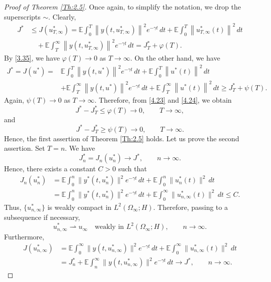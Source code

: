 \documentclass[a4paper,12pt]{article}
\numberwithin{equation}{section}
\begin{document}
\begin{proof}[Proof of Theorem \ref{Th:2.5}] Once again, to simplify the notation, we drop the superscripts $\sim$. Clearly,  
\begin{align}
J^*
&\leq
J(u_{T,\infty}^*) =
\mathbb{E}
\int_0^T
\left\|
y(t,u_{T,\infty}^*)
\right\|^2
e^{-\gamma t}\,dt
+
\mathbb{E}
\int_0^T
\left\|
u_{T,\infty}^*(t)
\right\|^2\,dt
\nonumber\\
&\quad+
\mathbb{E}
\int_T^\infty
\left\|
y(t,u_{T,\infty}^*)
\right\|^2
e^{-\gamma t}\,dt =
J_T^*+\varphi(T).
\label{4.23}
\end{align}
By \eqref{3.35},  we have $\varphi(T) \to 0$ as $T \to \infty$. On the other hand, we have
\begin{align}
J^*
=
J(u^*)
={}&
\mathbb{E}
\int_0^T
\left\|
y(t,u^*)
\right\|^2
e^{-\gamma t}\,dt
+
\mathbb{E}
\int_0^T
\left\|
u^*(t)
\right\|^2\,dt
\nonumber\\
&+
\mathbb{E}
\int_T^\infty
\left\|
y(t,u^*)
\right\|^2
e^{-\gamma t}\,dt
+
\mathbb{E}
\int_T^\infty
\left\|
u^*(t)
\right\|^2\,dt
\geq
J_T^*+\psi(T).
\label{4.24}
\end{align}
Again, $\psi(T)\to 0$ as $T\to\infty$. Therefore, from
\eqref{4.23} and \eqref{4.24}, we obtain
\[
J^*-J_T^*
\leq
\varphi(T)
\to 0,
\qquad T\to\infty,
\]
and
\[
J^*-J_T^*
\geq
\psi(T)
\to 0,
\qquad T\to\infty.
\]
Hence, the first assertion of Theorem \ref{Th:2.5} holds. Let us prove the second assertion. Set $T=n$. We have
\[
J_n^*
=
J_n(u_n^*)
\longrightarrow
J^*,
\qquad n\to\infty.
\]
Hence, there exists a constant $C>0$ such that
\[
\begin{aligned}
J_n(u_n^*)
&=
\mathbb{E}
\int_0^n
\|y^*(t,u_n^*)\|^2
e^{-\gamma t}\,dt
+
\mathbb{E}
\int_0^n
\|u_n^*(t)\|^2\,dt
\\
&=
\mathbb{E}
\int_0^n
\|y^*(t,u_n^*)\|^2
e^{-\gamma t}\,dt
+
\mathbb{E}
\int_0^\infty
\|u_{n,\infty}^*(t)\|^2\,dt
\leq C.
\end{aligned}
\]
Thus, $\{u_{n,\infty}^*\}$ is weakly compact in
$L^2(\Omega_\infty;H)$. Therefore, passing to a subsequence if
necessary,
\[
u_{n,\infty}^*
\rightharpoonup
u_\infty
\quad\text{weakly in }
L^2(\Omega_\infty;H),
\qquad n\to\infty.
\]
Furthermore, 
\[
\begin{aligned}
J(u_{n,\infty}^*)
&=
\mathbb{E}
\int_0^\infty
\|y(t,u_{n,\infty}^*)\|^2
e^{-\gamma t}\,dt
+
\mathbb{E}
\int_0^\infty
\|u_{n,\infty}^*(t)\|^2\,dt
\\
&=
J_n^*
+
\mathbb{E}
\int_n^\infty
\|y(t,u_{n,\infty}^*)\|^2
e^{-\gamma t}\,dt
\to
J^*,
\qquad n\to\infty.
\end{aligned}
\]
\end{proof}
\end{document}
